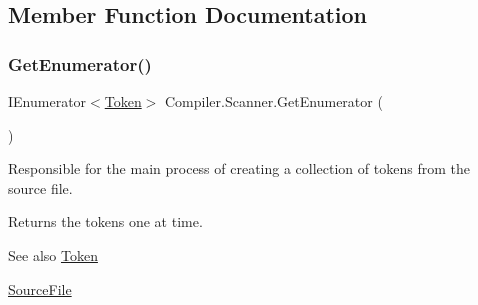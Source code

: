 \subsection{Member Function Documentation}
\mbox{\label{class_compiler_1_1_scanner_aea1e54cd0fb8a4b19f9403be60720ff9}} 
\subsubsection{\texorpdfstring{Get\+Enumerator()}{GetEnumerator()}\hspace{0.1cm}{\footnotesize\ttfamily [1/2]}}
{\footnotesize\ttfamily I\+Enumerator$<$\mbox{\hyperlink{class_compiler_1_1_token}{Token}}$>$ Compiler.\+Scanner.\+Get\+Enumerator (\begin{DoxyParamCaption}{ }\end{DoxyParamCaption})}

Responsible for the main process of creating a collection of tokens from the source file. \begin{DoxyReturn}{Returns}
the tokens one at time. 
\end{DoxyReturn}
\begin{DoxySeeAlso}{See also}
\mbox{\hyperlink{class_compiler_1_1_token}{Token}} 

\mbox{\hyperlink{class_compiler_1_1_source_file}{Source\+File}} 
\end{DoxySeeAlso}

